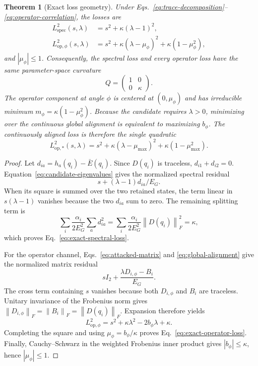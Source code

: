 \documentclass[11pt]{article}
\newcommand{\norm}[1]{\left\lVert #1\right\rVert}
\newtheorem{theorem}{Theorem}
\begin{document}
\begin{theorem}[Exact loss geometry]
\label{thm:exact-loss-geometry}
Under Eqs.~\eqref{eq:trace-decomposition}--\eqref{eq:operator-correlation}, the losses are
\begin{align}
 L_{\mathrm{spec}}^2(s,\lambda)
 &=s^2+\kappa(\lambda-1)^2,
 \label{eq:exact-spectral-loss}\\
 L_{\mathrm{op},\phi}^2(s,\lambda)
 &=s^2+\kappa(\lambda-\mu_\phi)^2
   +\kappa(1-\mu_\phi^2),
 \label{eq:exact-operator-loss}
\end{align}
and $|\mu_\phi|\le1$. Consequently, the spectral loss and every operator loss have the
same parameter-space curvature
\begin{equation}
 Q=\begin{pmatrix}1&0\\0&\kappa\end{pmatrix}.
 \label{eq:common-curvature}
\end{equation}
The operator component at angle $\phi$ is centered at $(0,\mu_\phi)$ and has irreducible
minimum $m_\phi=\kappa(1-\mu_\phi^2)$. Because the candidate requires $\lambda>0$,
minimizing over the continuous global alignment is equivalent to maximizing $b_\phi$.
The continuously aligned loss is therefore the single quadratic
\begin{equation}
 L_{\mathrm{op},*}^2(s,\lambda)
 =s^2+\kappa(\lambda-\mu_{\max})^2
  +\kappa(1-\mu_{\max}^2).
 \label{eq:continuously-optimized-operator-loss}
\end{equation}
\end{theorem}

\begin{proof}
Let $d_{ia}=h_a(q_i)-\bar E(q_i)$. Since $D(q_i)$ is traceless,
$d_{i1}+d_{i2}=0$. Equation~\eqref{eq:candidate-eigenvalues} gives the normalized
spectral residual
\[
 s+(\lambda-1)d_{ia}/E_G.
\]
When its square is summed over the two retained states, the term linear in $s(\lambda-1)$
vanishes because the two $d_{ia}$ sum to zero. The remaining splitting term is
\[
 \sum_i\frac{\alpha_i}{2E_G^2}\sum_a d_{ia}^2
 =\sum_i\frac{\alpha_i}{2E_G^2}\norm{D(q_i)}_F^2
 =\kappa,
\]
which proves Eq.~\eqref{eq:exact-spectral-loss}.

For the operator channel, Eqs.~\eqref{eq:attacked-matrix} and
\eqref{eq:global-alignment} give the normalized matrix residual
\[
 sI_2+\frac{\lambda D_{i,\phi}-B_i}{E_G}.
\]
The cross term containing $s$ vanishes because both $D_{i,\phi}$ and $B_i$ are
traceless. Unitary invariance of the Frobenius norm gives
$\norm{D_{i,\phi}}_F=\norm{B_i}_F=\norm{D(q_i)}_F$. Expansion therefore yields
\[
 L_{\mathrm{op},\phi}^2
 =s^2+\kappa\lambda^2-2b_\phi\lambda+\kappa.
\]
Completing the square and using $\mu_\phi=b_\phi/\kappa$ proves
Eq.~\eqref{eq:exact-operator-loss}. Finally, Cauchy--Schwarz in the weighted Frobenius
inner product gives $|b_\phi|\le\kappa$, hence $|\mu_\phi|\le1$.
\end{proof}
\end{document}
